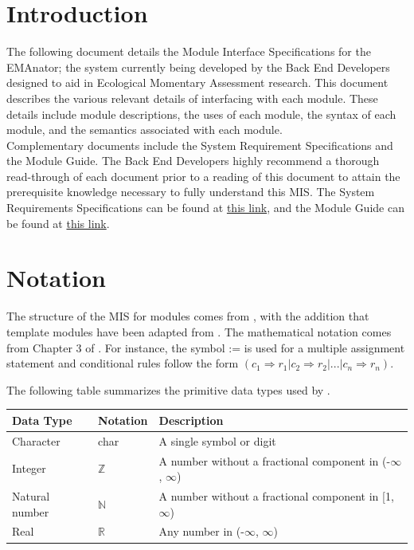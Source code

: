\documentclass[12pt, titlepage]{article}
\begin{document}
\newpage

\tableofcontents

\newpage


\section{Introduction}

The following document details the Module Interface Specifications for the EMAnator; the system currently being developed by the Back End Developers designed to aid in Ecological Momentary Assessment research. This document describes the various relevant details of interfacing with each module. These details include  module descriptions, the uses of each module, the syntax of each module, and the semantics associated with each module.\\

Complementary documents include the System Requirement Specifications and the Module Guide. The Back End Developers highly recommend a thorough read-through of each document prior to a reading of this document to attain the prerequisite knowledge necessary to fully understand this MIS. The System Requirements Specifications can be found at \href{https://github.com/zakerl/Capstone_Project/blob/main/docs/SRS/SRS.tex}{this link}, and the Module Guide can be found at \href{https://github.com/zakerl/Capstone_Project/blob/main/docs/Design/SoftArchitecture/MG.pdf}{this link}.

\section{Notation}

The structure of the MIS for modules comes from \citet{HoffmanAndStrooper1995},
with the addition that template modules have been adapted from
\cite{GhezziEtAl2003}.  The mathematical notation comes from Chapter 3 of
\citet{HoffmanAndStrooper1995}.  For instance, the symbol := is used for a
multiple assignment statement and conditional rules follow the form $(c_1
\Rightarrow r_1 | c_2 \Rightarrow r_2 | ... | c_n \Rightarrow r_n )$.

The following table summarizes the primitive data types used by \progname. 

\begin{center}
\renewcommand{\arraystretch}{1.2}
\noindent 
\begin{tabular}{l l p{7.5cm}} 
\toprule 
\textbf{Data Type} & \textbf{Notation} & \textbf{Description}\\ 
\midrule
Character & char & A single symbol or digit\\
Integer & $\mathbb{Z}$ & A number without a fractional component in (-$\infty$, $\infty$) \\
Natural number & $\mathbb{N}$ & A number without a fractional component in [1, $\infty$) \\
Real & $\mathbb{R}$ & Any number in (-$\infty$, $\infty$)\\
\bottomrule
\end{tabular} 
\end{center}
\end{document}
